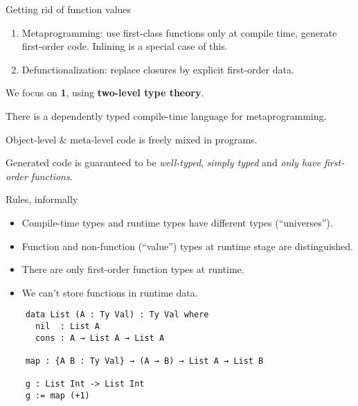 \documentclass[dvipsnames,aspectratio=169]{beamer}
\theoremstyle{remark}
\begin{document}

\begin{frame}{Getting rid of function values}

  \begin{enumerate}
  \item Metaprogramming: use first-class functions only at compile time, generate first-order code.
        Inlining is a special case of this.
  \item Defunctionalization: replace closures by explicit first-order data.
  \end{enumerate}
\vspace{1em}

We focus on \textbf{1}, using \textbf{two-level type theory}.
\vspace{1em}
\pause

There is a dependently typed compile-time language for metaprogramming.
\vspace{1em}
\pause

Object-level \& meta-level code is freely mixed in programs.
\vspace{1em}
\pause

Generated code is guaranteed to be \emph{well-typed}, \emph{simply typed} and \emph{only have first-order functions}.

\end{frame}


\begin{frame}[fragile]{}
\begin{block}{Rules, informally}
  \begin{itemize}
  \item Compile-time types and runtime types have different types (``universes'').
  \item Function and non-function (``value'') types at runtime stage are distinguished.
  \item There are only first-order function types at runtime.
  \item We can't store functions in runtime data.
  \end{itemize}
\end{block}

\begin{exampleblock}{}
\begin{verbatim}
    data List (A : Ty Val) : Ty Val where
      nil  : List A
      cons : A → List A → List A

    map : {A B : Ty Val} → (A → B) → List A → List B

    g : List Int -> List Int
    g := map (+1)
\end{verbatim}
\end{exampleblock}
\end{frame}
\end{document}
